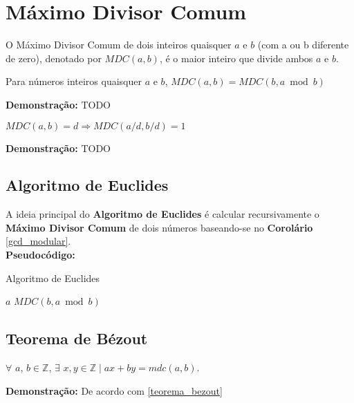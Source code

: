 \section{Máximo Divisor Comum}

\begin{definition}
O Máximo Divisor Comum de dois inteiros quaisquer $a$ e $b$ (com a ou b diferente de zero), denotado por $MDC(a,b)$, é o maior inteiro que divide ambos $a$ e $b$.
\end{definition}


\begin{corollary}\label{gcd_modular}
Para números inteiros quaisquer $a$ e $b$, $MDC(a,b) = MDC(b, a \bmod b)$
\end{corollary}
\textbf{Demonstração:}
TODO


\begin{corollary}\label{divisibilidade_mdc}
$MDC(a,b) = d \Rightarrow MDC(a/d, b/d) = 1$
\end{corollary}
\textbf{Demonstração:}
TODO


\subsection{Algoritmo de Euclides}
A ideia principal do \textbf{Algoritmo de Euclides} é calcular recursivamente o \textbf{Máximo Divisor Comum} de dois números baseando-se no 
\textbf{Corolário} \autoref{gcd_modular}.\\

\textbf{Pseudocódigo:}
\begin{algorithm}
\caption{Algoritmo de Euclides}\label{mdc}
\begin{algorithmic}[1]
\State \Return $a$
\Else
\State \Return $MDC(b, a \bmod b)$
\EndIf
\EndProcedure
\end{algorithmic}
\end{algorithm}




\subsection{Teorema de Bézout}

\begin{theorem}\label{teorema_bezout}
$\forall$ $a$, $b \in \mathbb{Z}$, $\exists$ $x, y \in \mathbb{Z} \mid ax + by = mdc(a, b).$
\end{theorem}
\textbf{Demonstração:}
De acordo com \autoref{teorema_bezout}




